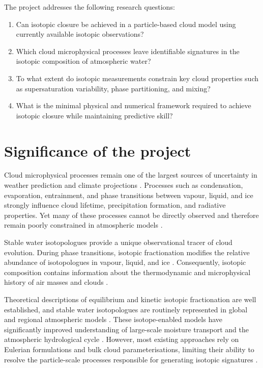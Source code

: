 \documentclass[12pt]{article}
\begin{document}
The project addresses the following research questions:
\begin{enumerate}
    \item[\textbf{Q1}]\label{Q1} Can isotopic closure be achieved in a particle-based
        cloud model using currently available isotopic observations?
    \item[\textbf{Q2}]\label{Q2} Which cloud microphysical processes leave
        identifiable signatures in the isotopic composition
        of atmospheric water?
    \item[\textbf{Q3}]\label{Q3} To what extent do isotopic measurements constrain
        key cloud properties such as supersaturation variability,
        phase partitioning, and mixing?
    \item[\textbf{Q4}]\label{Q4} What is the minimal physical and numerical
        framework required to achieve isotopic closure
        while maintaining predictive skill?
\end{enumerate}


\section{Significance of the project}
Cloud microphysical processes remain one of the largest sources of
uncertainty in weather prediction and climate projections \parencite{IPCC2021_WGI}.
Processes such as condensation, evaporation, entrainment,
and phase transitions between vapour, liquid, and ice strongly
influence cloud lifetime, precipitation formation,
and radiative properties.
Yet many of these processes cannot
be directly observed and therefore remain poorly constrained
in atmospheric models \parencite{2013_Grabowski_Wang}.

Stable water isotopologues provide a unique observational tracer 
of cloud evolution.
During phase transitions, isotopic fractionation modifies
the relative abundance of isotopologues in vapour, liquid, and ice \parencite{2017_Lamb_EtAl}.
Consequently, isotopic composition contains information about 
the thermodynamic and microphysical history of air masses and
clouds \parencite{2013_Bolot_EtAl}.

Theoretical descriptions of equilibrium and kinetic isotopic
fractionation are well established,
and stable water isotopologues are routinely represented
in global and regional atmospheric models \parencite{2016_Galewsky_EtAl}.
These isotope-enabled models have significantly improved
understanding of large-scale moisture transport and
the atmospheric hydrological cycle \parencite{2020_Risi_EtAl}.
However, most existing approaches rely on Eulerian formulations
and bulk cloud parameterisations, limiting their ability
to resolve the particle-scale processes responsible for
generating isotopic signatures \parencite{1984_Joussaume_EtAl, 2008_Yoshimura_EtAl, 2011_Werner_EtAl, 2016_Galewsky_EtAl}.
\end{document}
